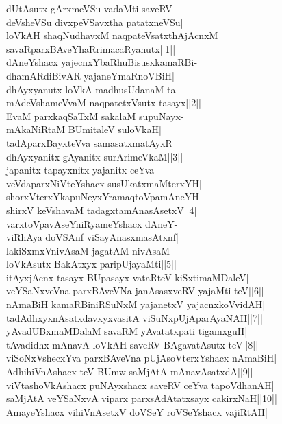 \documentclass{article}
\begin{document}
dUtAsutx gArxmeVSu vadaMti saveRV\\
deVsheVSu divxpeVSavxtha patatxneVSu|\\
loVkAH shaqNudhavxM naqpateVsatxthAjAcnxM\\
savaRparxBAveYhaRrimacaRyanutx||1||\\
dAneYshacx yajecnxYbaRhuBisusxkamaRBi-\\
dhamARdiBivAR yajaneYmaRnoVBiH|\\
dhAyxyanutx loVkA madhusUdanaM ta-\\
mAdeVshameVvaM naqpatetxVsutx tasayx||2||\\
EvaM parxkaqSaTxM sakalaM supuNayx-\\
mAkaNiRtaM BUmitaleV suloVkaH|\\
tadAparxBayxteVva samasatxmatAyxR\\
dhAyxyanitx gAyanitx surArimeVkaM||3||\\
japanitx tapayxnitx yajanitx ceYva\\
veVdaparxNiVteYshacx susUkatxmaMterxYH|\\
shorxVterxYkapuNeyxYramaqtoVpamAneYH\\
shirxV keVshavaM tadagxtamAnasAsetxV||4||\\
varxtoVpavAseYniRyameYshacx dAneY-\\
viRhAya doVSAnf viSayAnasxmasAtxnf|\\
lakiSxmxVnivAsaM jagatAM nivAsaM\\
loVkAsutx BakAtxyx paripUjayaMti||5||\\
itAyxjAcnx tasayx BUpasayx vataRteV kiSxtimaMDaleV|\\
veYSaNxveVna parxBAveVNa janAsasxveRV yajaMti teV||6||\\
nAmaBiH kamaRBiniRSuNxM yajanetxV yajacnxkoVvidAH|\\
tadAdhxyxnAsatxdavxyxvasitA viSuNxpUjAparAyaNAH||7||\\
yAvadUBxmaMDalaM savaRM yAvatatxpati tigamxguH|\\
tAvadidhx mAnavA loVkAH saveRV BAgavatAsutx teV||8||\\
viSoNxVshecxYva parxBAveVna pUjAsoVterxYshacx nAmaBiH|\\
AdhihiVnAshacx teV BUmw saMjAtA mAnavAsatxdA||9||\\
viVtashoVkAshacx puNAyxshacx saveRV ceYva tapoVdhanAH|\\
saMjAtA veYSaNxvA viparx parxsAdAtatxsayx cakirxNaH||10||\\
AmayeYshacx vihiVnAsetxV doVSeY roVSeYshacx vajiRtAH|\\
\end{document}
